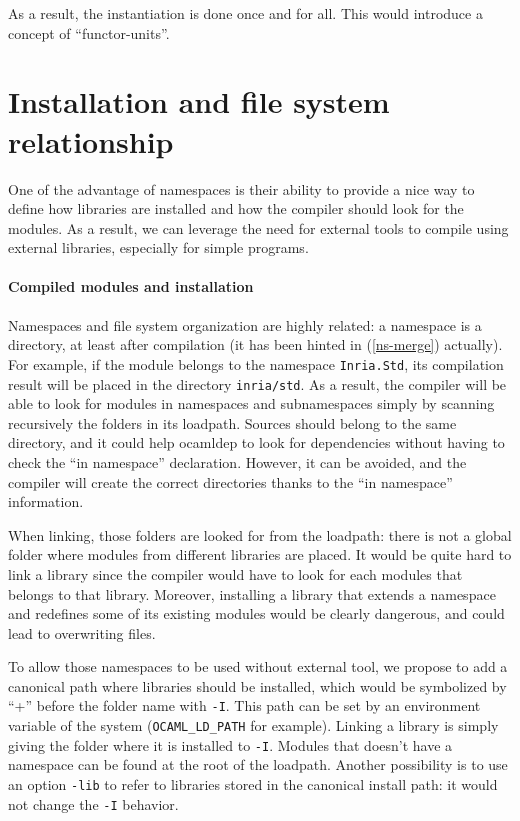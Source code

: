 \documentclass[11pt,a4paper]{article}
\begin{document}
As a result, the instantiation is done once and for all. This would introduce a
concept of ``functor-units''.

\section{Installation and file system relationship}

One of the advantage of namespaces is their ability to provide a nice way to
define how libraries are installed and how the compiler should look for the
modules. As a result, we can leverage the need for external tools to compile
using external libraries, especially for simple programs.

\paragraph{Compiled modules and installation}

Namespaces and file system organization are highly related: a namespace is a
directory, at least after compilation (it has been hinted in (\ref{ns-merge})
actually). For example, if the module belongs to the namespace
\texttt{Inria.Std}, its compilation result will be placed in the directory
\texttt{inria/std}. As a result, the compiler will be able to look for modules
in namespaces and subnamespaces simply by scanning recursively the folders in
its loadpath. Sources should belong to the same directory, and it could help
ocamldep to look for dependencies without having to check the ``in namespace''
declaration. However, it can be avoided, and the compiler will create the
correct directories thanks to the ``in namespace'' information.

When linking, those folders are looked for from the loadpath: there is not a
global folder where modules from different libraries are placed. It would be
quite hard to link a library since the compiler would have to look for each
modules that belongs to that library. Moreover, installing a library that
extends a namespace and redefines some of its existing modules would be clearly
dangerous, and could lead to overwriting files.

To allow those namespaces to be used without external tool, we propose to add a
canonical path where libraries should be installed, which would be symbolized by
``+'' before the folder name with \texttt{-I}. This path can be set by an
environment variable of the system (\texttt{OCAML\_LD\_PATH} for
example). Linking a library is simply giving the folder where it is installed to
\texttt{-I}. Modules that doesn't have a namespace can be found at the root of
the loadpath. Another possibility is to use an option \texttt{-lib} to refer to
libraries stored in the canonical install path: it would not change the \texttt{-I}
behavior.
\end{document}
